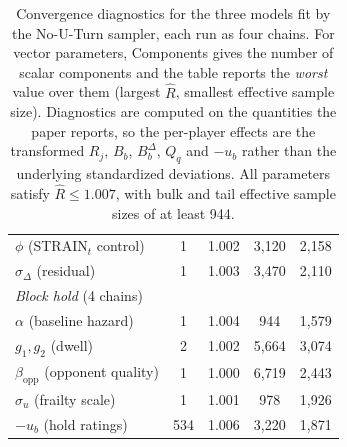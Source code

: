\begin{table}[h!]
\begin{tabular}{lcccc}
$\phi$ (STRAIN$_t$ control) & 1 & 1.002 & 3,120 & 2,158 \\
$\sigma_{\Delta}$ (residual) & 1 & 1.003 & 3,470 & 2,110 \\
\midrule
\multicolumn{5}{l}{\emph{Block hold} (4 chains)} \\
\midrule
$\alpha$ (baseline hazard) & 1 & 1.004 & 944 & 1,579 \\
$g_1,g_2$ (dwell) & 2 & 1.002 & 5,664 & 3,074 \\
$\beta_{\mathrm{opp}}$ (opponent quality) & 1 & 1.000 & 6,719 & 2,443 \\
$\sigma_u$ (frailty scale) & 1 & 1.001 & 978 & 1,926 \\
$-u_b$ (hold ratings) & 534 & 1.006 & 3,220 & 1,871 \\
\bottomrule
\end{tabular}
\caption{Convergence diagnostics for the three models fit by the No-U-Turn sampler, each run as four chains. For vector parameters, Components gives the number of scalar components and the table reports the \emph{worst} value over them (largest $\widehat{R}$, smallest effective sample size). Diagnostics are computed on the quantities the paper reports, so the per-player effects are the transformed $R_j$, $B_b$, $B^{\Delta}_b$, $Q_q$ and $-u_b$ rather than the underlying standardized deviations. All parameters satisfy $\widehat{R} \leq 1.007$, with bulk and tail effective sample sizes of at least 944.}
\label{tab:mcmc_diagnostics}
\end{table}

